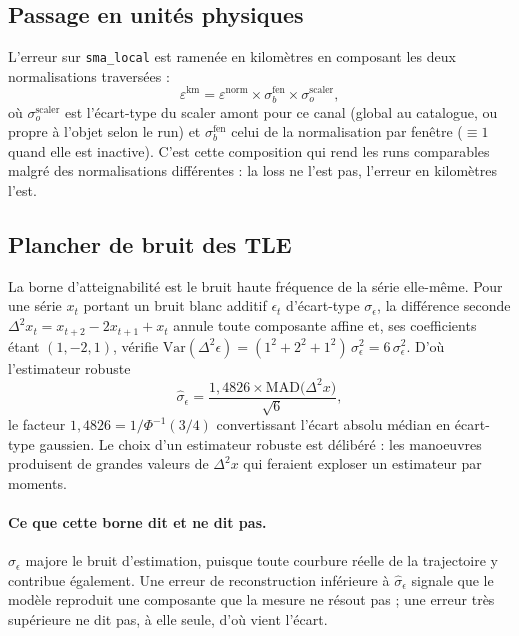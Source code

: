 \documentclass{article}
\begin{document}
\subsection{Passage en unités physiques}

L'erreur sur \texttt{sma\_local} est ramenée en kilomètres en composant les deux normalisations traversées :
\begin{equation}
\varepsilon^{\text{km}} = \varepsilon^{\text{norm}} \times \sigma^{\text{fen}}_{b} \times \sigma^{\text{scaler}}_{o},
\end{equation}
où $\sigma^{\text{scaler}}_{o}$ est l'écart-type du scaler amont pour ce canal (global au catalogue, ou propre à l'objet selon le run) et $\sigma^{\text{fen}}_{b}$ celui de la normalisation par fenêtre ($\equiv 1$ quand elle est inactive). C'est cette composition qui rend les runs comparables malgré des normalisations différentes : la loss ne l'est pas, l'erreur en kilomètres l'est.

\subsection{Plancher de bruit des TLE}

La borne d'atteignabilité est le bruit haute fréquence de la série elle-même. Pour une série $x_t$ portant un bruit blanc additif $\epsilon_t$ d'écart-type $\sigma_\epsilon$, la différence seconde $\Delta^2 x_t = x_{t+2}-2x_{t+1}+x_t$ annule toute composante affine et, ses coefficients étant $(1,-2,1)$, vérifie $\mathrm{Var}(\Delta^2 \epsilon) = (1^2+2^2+1^2)\,\sigma_\epsilon^2 = 6\,\sigma_\epsilon^2$. D'où l'estimateur robuste
\begin{equation}
\hat{\sigma}_\epsilon = \frac{1{,}4826 \times \mathrm{MAD}\bigl(\Delta^2 x\bigr)}{\sqrt{6}},
\end{equation}
le facteur $1{,}4826 = 1/\Phi^{-1}(3/4)$ convertissant l'écart absolu médian en écart-type gaussien. Le choix d'un estimateur robuste est délibéré : les manoeuvres produisent de grandes valeurs de $\Delta^2 x$ qui feraient exploser un estimateur par moments.

\paragraph{Ce que cette borne dit et ne dit pas.} $\hat{\sigma}_\epsilon$ majore le bruit d'estimation, puisque toute courbure réelle de la trajectoire y contribue également. Une erreur de reconstruction inférieure à $\hat{\sigma}_\epsilon$ signale que le modèle reproduit une composante que la mesure ne résout pas ; une erreur très supérieure ne dit pas, à elle seule, d'où vient l'écart.
\end{document}
